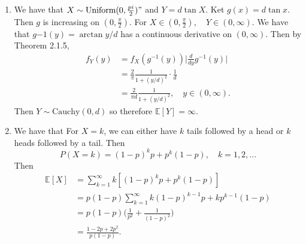 \documentclass{article}
\DeclareMathOperator{\var}{Var}
\begin{document}
\begin{enumerate}
\begin{enumerate}
        \item We first find the cdf of $Y$.
        \[ F_{Y}(y) = P(|X| \leq y) = P(-y \leq X \leq y) = F_{X}(y) - F_{X}(-y). \]
        Therefore the pdf of $Y$ is just 
        \begin{align*}
            f_{Y}(y) \\
            &= f_{X}(y) + f_{X}(-y) \\
            &= \frac{1}{\sqrt{2\pi}} e^{-\frac{y^2}{2}} 
            + \frac{1}{\sqrt{2\pi}} e^{-\frac{y^2}{2}} \\
            &= \sqrt{\frac{2}{\pi}} e^{-\frac{y^2}{2}}, \quad y \in [0, \infty).
        \end{align*}
        Therefore we can find the mean and variance of $Y$: 
        \begin{align*}
            \mathbb{E}[Y]
            &= \int_{0}^{\infty} y \sqrt{\frac{2}{\pi}} e^{-\frac{y^2}{2}} \\
            &= \sqrt{\frac{2}{\pi}} [-e^{-\frac{y^2}{2}}]_{0}^{\infty} \\
            &= \sqrt{\frac{2}{\pi}}.
        \end{align*}
        From part (a), 
        \[ \mathbb{E}[Y^2] = \mathbb{E}[|X|^2] = \mathbb{E}[X^2] = 1. \]
        Therefore, 
        \[ \var(Y) = \mathbb{E}[Y^2] - (\mathbb{E}[Y])^2 = 1 - \frac{2}{\pi}. \]
    \end{enumerate}

    \item We have that $X \sim \text{Uniform}(0, \frac{pi}{2})"$ and $Y = d\tan{X}$. 
    Ket $g(x) = d\tan{x}$. Then $g$ is increasing on $(0, \frac{\pi}{2})$. For 
    $X \in (0, \frac{\pi}{2}), \quad Y \in (0, \infty)$. We have that 
    $g{-1}(y) = \arctan{y/d}$ has a continuous derivative on $(0, \infty)$. Then by 
    Theorem 2.1.5, 
    \begin{align*}
        f_{Y}(y) 
        &= f_{X}(g^{-1}(y)) \Big| \frac{d}{dy}g^{-1}(y) \Big| \\
        &= \frac{2}{\pi} \frac{1}{1 + (y/d)^2} \cdot \frac{1}{d} \\
        &= \frac{2}{\pi d} \frac{1}{1 + (y/d)^2}, \quad y \in (0, \infty).
    \end{align*}
    Then $Y \sim \text{Cauchy}(0, d)$ so therefore $\mathbb{E}[Y] = \infty$.

    \item We have that For $X = k$, we can either have $k$ tails followed by a head or $k$ 
    heads followed by a tail. Then 
    \[ P(X = k) = (1 - p)^{k}p + p^{k}(1 - p), \quad k = 1, 2, ... \]
    Then 
    \begin{align*}
        \mathbb{E}[X] 
        &= \sum_{k = 1}^{\infty} k[(1 - p)^{k}p + p^{k}(1 - p)] \\
        &= p(1 - p) \sum_{k = 1}^{\infty} k(1 - p)^{k - 1}p + kp^{k - 1}(1 - p) \\
        &= p(1 - p) \Big( \frac{1}{p^2} + \frac{1}{(1 - p)^2}) \\
        &= \frac{1 -2p + 2p^2}{p(1 - p)}.
    \end{align*}


\end{enumerate}
\end{document}
